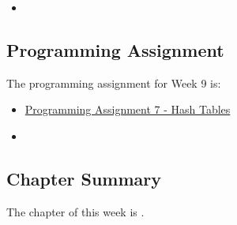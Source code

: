 \begin{itemize}
    \item {}
\end{itemize}

\subsection{Programming Assignment}

The programming assignment for Week 9 is:

\begin{itemize}
    \item \href{https://github.com/QuantumCompiler/CU/tree/main/CSPB%202270%20-%20Data%20Structures/CSPB%202270%20-%20Programming%20Assignments/CSPB%202270%20-%20Assignment%207%20-%20Hash%20Table}{Programming Assignment 7 - Hash Tables}
    \item {}
\end{itemize}

\subsection{Chapter Summary}

The chapter of this week is .

